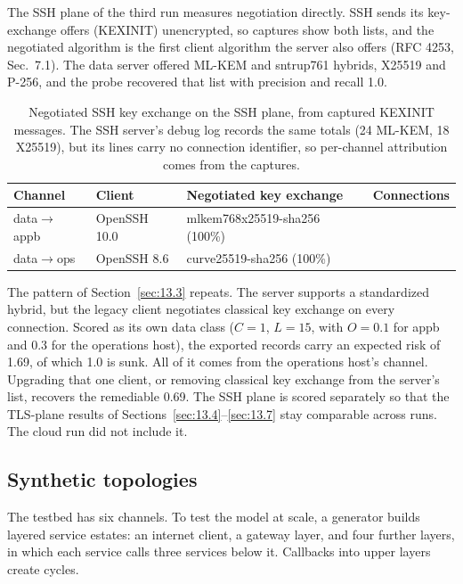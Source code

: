 \documentclass[conference]{IEEEtran}
\begin{document}
The SSH plane of the third run measures negotiation directly. SSH sends its key-exchange offers (KEXINIT) unencrypted, so captures show both lists, and the negotiated algorithm is the first client algorithm the server also offers (RFC 4253, Sec.~7.1). The data server offered ML-KEM and sntrup761 hybrids, X25519 and P-256, and the probe recovered that list with precision and recall 1.0.
\begin{table}[!t]
\centering\footnotesize
\caption{Negotiated SSH key exchange on the SSH plane, from captured KEXINIT messages. The SSH server's debug log records the same totals (24 ML-KEM, 18 X25519), but its lines carry no connection identifier, so per-channel attribution comes from the captures.}\label{tab:9}
\begin{tabularx}{\linewidth}{>{\raggedright\arraybackslash}X>{\raggedright\arraybackslash}X>{\raggedright\arraybackslash}X>{\raggedleft\arraybackslash}X}
\toprule
\textbf{Channel} & \textbf{Client} & \textbf{Negotiated key exchange} & \textbf{Connections} \\ \midrule
data$\rightarrow$appb & OpenSSH 10.0 & mlkem768x25519-sha256 (100\%) & 24 \\
data$\rightarrow$ops & OpenSSH 8.6 & curve25519-sha256 (100\%) & 18 \\
\bottomrule
\end{tabularx}
\end{table}

The pattern of Section~\ref{sec:13.3} repeats. The server supports a standardized hybrid, but the legacy client negotiates classical key exchange on every connection. Scored as its own data class ($C = 1$, $L = 15$, with $O = 0.1$ for appb and 0.3 for the operations host), the exported records carry an expected risk of 1.69, of which 1.0 is sunk. All of it comes from the operations host's channel. Upgrading that one client, or removing classical key exchange from the server's list, recovers the remediable 0.69. The SSH plane is scored separately so that the TLS-plane results of Sections~\ref{sec:13.4}--\ref{sec:13.7} stay comparable across runs. The cloud run did not include it.

\subsection{Synthetic topologies}\label{sec:13.9}

The testbed has six channels. To test the model at scale, a generator builds layered service estates: an internet client, a gateway layer, and four further layers, in which each service calls three services below it. Callbacks into upper layers create cycles.
\end{document}

